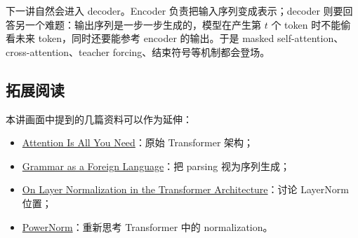 \documentclass[a4paper]{article}
\begin{document}
下一讲自然会进入 decoder。Encoder 负责把输入序列变成表示；decoder 则要回答另一个难题：输出序列是一步一步生成的，模型在产生第 $t$ 个 token 时不能偷看未来 token，同时还要能参考 encoder 的输出。于是 masked self-attention、cross-attention、teacher forcing、结束符号等机制都会登场。

\subsection{拓展阅读}

本讲画面中提到的几篇资料可以作为延伸：
\begin{itemize}
    \item \href{https://arxiv.org/abs/1706.03762}{Attention Is All You Need}：原始 Transformer 架构；
    \item \href{https://arxiv.org/abs/1412.7449}{Grammar as a Foreign Language}：把 parsing 视为序列生成；
    \item \href{https://arxiv.org/abs/2002.04745}{On Layer Normalization in the Transformer Architecture}：讨论 LayerNorm 位置；
    \item \href{https://arxiv.org/abs/2003.07845}{PowerNorm}：重新思考 Transformer 中的 normalization。
\end{itemize}
\end{document}
